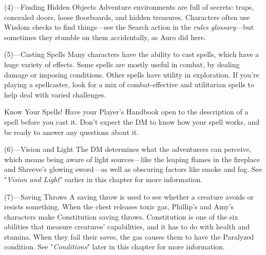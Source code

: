 \documentclass[10pt,a4paper,twoside,bg=print,twocolumn,openany,nodeprecatedcode]{dndbook}
\begin{document}
\begin{DndSidebar}[float=!b]{(4)—Finding Hidden Objects}
Adventure environments are full of secrets: traps, concealed doors, loose floorboards, and hidden treasures. Characters often use Wisdom checks to find things—see the Search action in the \textit{rules glossary}—but sometimes they stumble on them accidentally, as Auro did here.



\end{DndSidebar}

\begin{DndSidebar}[float=!b]{(5)—Casting Spells}
Many characters have the ability to cast spells, which have a huge variety of effects. Some spells are mostly useful in combat, by dealing damage or imposing conditions. Other spells have utility in exploration. If you're playing a spellcaster, look for a mix of combat-effective and utilitarian spells to help deal with varied challenges.



\end{DndSidebar}

\begin{DndSidebar}[float=!b]{Know Your Spells!}
Have your Player's Handbook open to the description of a spell before you cast it. Don't expect the DM to know how your spell works, and be ready to answer any questions about it.



\end{DndSidebar}

\begin{DndSidebar}[float=!b]{(6)—Vision and Light}
The DM determines what the adventurers can perceive, which means being aware of light sources—like the leaping flames in the fireplace and Shreeve's glowing sword—as well as obscuring factors like smoke and fog. See "\textit{Vision and Light}" earlier in this chapter for more information.



\end{DndSidebar}

\begin{DndSidebar}[float=!b]{(7)—Saving Throws}
A saving throw is used to see whether a creature avoids or resists something. When the chest releases toxic gas, Phillip's and Amy's characters make Constitution saving throws. Constitution is one of the six abilities that measure creatures' capabilities, and it has to do with health and stamina. When they fail their saves, the gas causes them to have the Paralyzed condition. See "\textit{Conditions}" later in this chapter for more information.



\end{DndSidebar}
\end{document}
